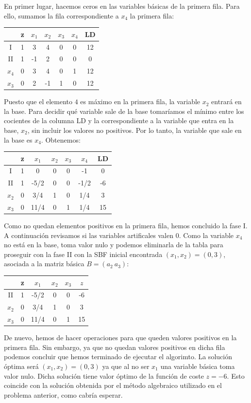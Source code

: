 \documentclass[11pt,table]{article}
\begin{document}
En primer lugar, hacemos ceros en las variables básicas de la primera fila. Para ello, sumamos la fila correspondiente a $x_4$ la primera fila:

\begin{table}[H]
	\centering
	\begin{tabular}{c|c|cccc|c}
		& z & $x_1$ & $x_2$ & $x_3$ & $x_4$ & LD \\
		\hline
		I & 1 & 3 & 4 & 0 & 0 & 12 \\
		II & 1 & -1 & 2 & 0 & 0 & 0 \\
		\hline
		$x_4$ & 0 & 3 & 4 & 0 & 1 & 12\\
		$x_3$ & 0 & 2 & -1 & 1 & 0 & 12
	\end{tabular}
\end{table}

Puesto que el elemento \(4\) es máximo en la primera fila, la variable \(x_2\) entrará en la base. Para decidir qué variable sale de la base tomaríamos el mínimo entre los cocientes de la columna LD y la correspondiente a la variable que entra en la base, \(x_2\), sin incluir los valores no positivos. Por lo tanto, la variable que sale en la base es \(x_4\). Obtenemos:

\begin{table}[H]
	\centering
	\begin{tabular}{c|ccccc|c}
		& z & $x_1$ & $x_2$ & $x_3$ & $x_4$ & LD \\
		\hline
		I & 1 & 0 & 0 & 0 & -1 & 0\\
		II & 1 & -5/2 & 0 & 0 & -1/2 & -6\\
		\hline
		$x_2$ & 0 & 3/4 & 1 & 0 & 1/4 & 3\\
		$x_3$ & 0 & 11/4 & 0 & 1 & 1/4 & 15
	\end{tabular}
\end{table}

Como no quedan elementos positivos en la primera fila, hemos concluido la fase I. A continuación revisamos si las variables artificales valen \(0\). Como la variable \(x_4\) no está en la base, toma valor nulo y podemos eliminarla de la tabla para proseguir con la fase II con la SBF inicial encontrada $(x_1, x_2)=(0, 3)$, asociada a la matriz básica $B=(a_2 \ a_3)$:

\begin{table}[H]
	\centering
	\begin{tabular}{c|cccc|c}
		& z & $x_1$ & $x_2$ & $x_3$ & $z$\\
        \hline
		II & 1 & -5/2 & 0 & 0 & -6\\
		\hline
		$x_2$ & 0 & 3/4 & 1 & 0 & 3\\
		$x_3$ & 0 & 11/4 & 0 & 1 & 15
	\end{tabular}
\end{table}

De nuevo, hemos de hacer operaciones para que queden valores positivos en la primera fila. Sin embargo, ya que no quedan valores positivos en dicha fila podemos concluir que hemos terminado de ejecutar el algorimto. La solución óptima será $(x_1, x_2)=(0, 3)$ ya que al no ser \(x_1\) una variable básica toma valor nulo. Dicha solución tiene valor óptimo de la función de coste $z=-6$. Esto coincide con la solución obtenida por el método algebraico utilizado en el problema anterior, como cabría esperar.
    
\end{document}
